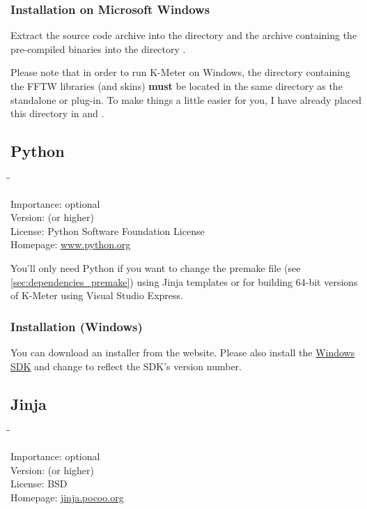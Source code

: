 \subsubsection{Installation on Microsoft Windows}

Extract the source code archive into the directory
 and the archive containing the pre-compiled
binaries into the directory .

Please note that in order to run K-Meter on Windows, the directory
 containing the FFTW libraries (and skins) \textbf{must}
be located in the same directory as the standalone or plug-in.  To
make things a little easier for you, I have already placed this
directory in  and .

\subsection{Python}

\begin{tabbing}
  \hspace*{6em}\=\=\kill

  Importance:  \> optional \\
  Version:      (or higher) \\
  License:     \> Python Software Foundation License \\
  Homepage:    \> \href{http://www.python.org/}{www.python.org}
\end{tabbing}

You'll only need Python if you want to change the premake file (see
\ref{sec:dependencies_premake}) using Jinja templates or for building
\num{64}-bit versions of K-Meter using Visual Studio Express.

\subsubsection{Installation (Windows)}

You can download an installer from the website.  Please also install
the \href{http://msdn.microsoft.com/windows/bb980924.aspx}{Windows
  SDK} and change  to reflect the SDK's version
number.

\subsection{Jinja}

\begin{tabbing}
  \hspace*{6em}\=\=\kill

  Importance:  \> optional \\
  Version:      (or higher) \\
  License:     \> BSD \\
  Homepage:    \> \href{http://http://jinja.pocoo.org/}{jinja.pocoo.org}
\end{tabbing}

